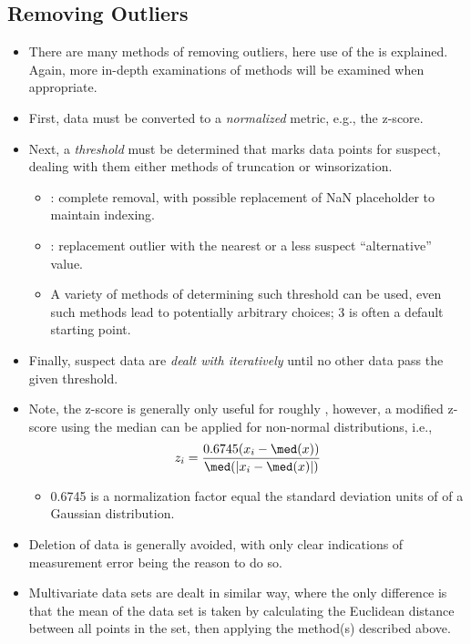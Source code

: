 \begin{itemize}
  \subsection{Removing Outliers}
  \begin{itemize}
    \item There are many methods of removing outliers, here use of the \hyperref[Subsection: Z-Score Standardization]{} is explained. Again, more in-depth examinations of methods will be examined when appropriate.
    \item First, data must be converted to a \emph{normalized} metric, e.g., the z-score.
    \item Next, a \emph{threshold} must be determined that marks data points for suspect, dealing with them either methods of truncation or winsorization.
      \begin{itemize}
        \item {}: complete removal, with possible replacement of NaN placeholder to maintain indexing.
        \item {}: replacement outlier with the nearest or a less suspect ``alternative'' value.
        \item A variety of methods of determining such threshold can be used, even such methods lead to potentially arbitrary choices; 3 is often a default starting point.
      \end{itemize}
    \item Finally, suspect data are \emph{dealt with iteratively} until no other data pass the given threshold.
    \item Note, the z-score is generally only useful for roughly \hyperref[Subsection: Probability Distributions]{}, however, a modified z-score using the median can be applied for non-normal distributions, i.e., 
    \[%
    z_i = \frac{0.6745(x_i-\med(x))}{\med(|x_i-\med(x)|)}
    \]%
    \begin{itemize}
      \item 0.6745 is a normalization factor equal the standard deviation units of \hyperref[boxplot]{} of a Gaussian distribution.
    \end{itemize}
    \item Deletion of data is generally avoided, with only clear indications of measurement error being the reason to do so. 
    \item Multivariate data sets are dealt in similar way, where the only difference is that the mean of the data set is taken by calculating the Euclidean distance between all points in the set, then applying the method(s) described above.
  \end{itemize}

\end{itemize}
